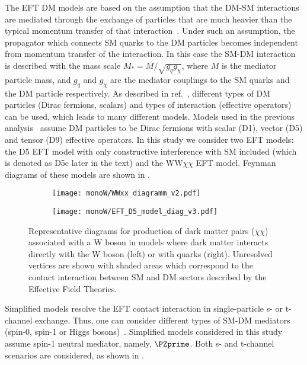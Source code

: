 The EFT DM models are based on the assumption that 
the DM-SM interactions are mediated through the exchange of particles that are much heavier than the typical momentum transfer of that interaction~\cite{arXiv:1512.00476}.
Under such an assumption, the propagator which connects SM quarks to the DM particles becomes independent from momentum transfer of the interaction. In this case the SM-DM interaction is described with the mass scale $M_{*} = M/\sqrt{g_q g_{\chi}}$, where $M$ is the mediator particle mass, and $g_q$ and $g_{\chi}$ are the mediator couplings to the SM quarks and the DM particle respectively. As described in ref.~\cite{dm_eft_models}, different types of DM particles (Dirac fermions, scalars) and types of interaction (effective operators) can be used, which leads to many different models.
Models used in the previous analysis~\cite{wprime_8TeV} assume DM particles to be Dirac fermions with scalar (D1), vector (D5) and tensor (D9) effective operators.
In this study we consider two EFT models: the D5 EFT model with only constructive interference with SM included (which is denoted as D5c later in the text) and the WW$\chi\chi$ EFT model.
Feynman diagrams of these models are shown in .

\begin{figure}[]

\centering
\begin{subfigure}{.5\textwidth}
  \centering
  \texttt{[image: monoW/WWxx\_diagramm\_v2.pdf]}
\end{subfigure}%
\begin{subfigure}{.5\textwidth}
  \centering
  \texttt{[image: monoW/EFT\_D5\_model\_diag\_v3.pdf]}
\end{subfigure}
  \caption{Representative diagrams for production of dark matter pairs ($\chi\overline{\chi}$) associated with a W boson in models where
dark matter interacts directly with the W boson (left) or with quarks (right).
Unresolved vertices are shown with shaded areas which correspond to the 
contact interaction between SM and DM sectors described by the Effective Field Theories.
}
  \label{fig:feynMonoWEFT}
\end{figure}

Simplified models resolve the EFT contact interaction in single-particle 
s- or t-channel exchange. Thus, one can consider different types of SM-DM mediators (spin-0, spin-1 or Higgs bosons)~\cite{dm_simplified_models}.
Simplified models considered in this study assume spin-1 neutral mediator, namely, $\PZprime$. Both s- and t-channel scenarios are considered, as shown in .

